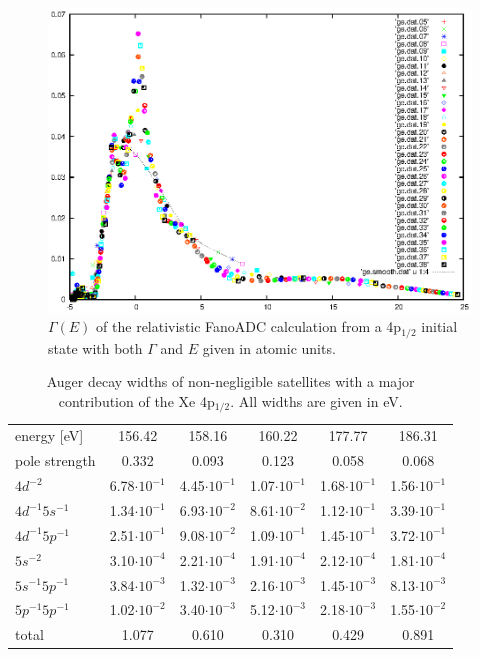 \begin{figure}[]
  \centering
  \includegraphics[scale=1.0]{pics/Xe4p_11_gammae.eps}
  \caption{$\Gamma(E)$ of the relativistic FanoADC calculation from a 4p$_{1/2}$
           initial state with both $\Gamma$ and $E$ given in atomic units.
           }
  \label{figure:Xe4p11_Gamma_profile}
\end{figure}


\begin{table}[]
 \centering
 \caption{Auger decay widths of non-negligible satellites with a major
          contribution of the Xe 4p$_{1/2}$. All widths are given in \unit{eV}.}
 \begin{tabular}{lccccc}
   \toprule
   energy [\unit{eV}] & 156.42  & 158.16 & 160.22 & 177.77 & 186.31\\
   pole strength       &   0.332 &   0.093&   0.123&   0.058&   0.068\\
   \midrule
   $4d^{-2}$          & 6.78$\cdot10^{-1}$ & 4.45$\cdot10^{-1}$ & 1.07$\cdot10^{-1}$ & 1.68$\cdot10^{-1}$ & 1.56$\cdot10^{-1}$\\
   $4d^{-1}5s^{-1}$   & 1.34$\cdot10^{-1}$ & 6.93$\cdot10^{-2}$ & 8.61$\cdot10^{-2}$ & 1.12$\cdot10^{-1}$ & 3.39$\cdot10^{-1}$\\
   $4d^{-1}5p^{-1}$   & 2.51$\cdot10^{-1}$ & 9.08$\cdot10^{-2}$ & 1.09$\cdot10^{-1}$ & 1.45$\cdot10^{-1}$ & 3.72$\cdot10^{-1}$\\
   $5s^{-2}$          & 3.10$\cdot10^{-4}$ & 2.21$\cdot10^{-4}$ & 1.91$\cdot10^{-4}$ & 2.12$\cdot10^{-4}$ & 1.81$\cdot10^{-4}$\\
   $5s^{-1}5p^{-1}$   & 3.84$\cdot10^{-3}$ & 1.32$\cdot10^{-3}$ & 2.16$\cdot10^{-3}$ & 1.45$\cdot10^{-3}$ & 8.13$\cdot10^{-3}$\\
   $5p^{-1}5p^{-1}$   & 1.02$\cdot10^{-2}$ & 3.40$\cdot10^{-3}$ & 5.12$\cdot10^{-3}$ & 2.18$\cdot10^{-3}$ & 1.55$\cdot10^{-2}$\\
   \midrule
   total              &   1.077 &   0.610&   0.310&   0.429&   0.891\\
   \bottomrule
 \end{tabular}
 \label{table:xe_auger_rel11}
\end{table}

